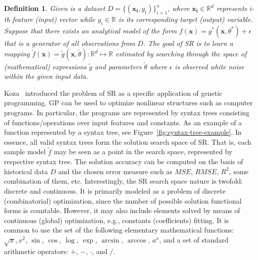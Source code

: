 \documentclass{bmcart}
\newtheorem{definition}{Definition}
\begin{document}
\begin{definition}
	Given is a dataset $D = \{(\mathbf{x_i}, y_i)\}_{i=1}^n$, where $\mathbf{x_i} \in \mathbb{R}^d$ represents i-th feature (input) vector while $y_i \in \mathbb{R}$ is its corresponding target (output) variable. Suppose that there exists an analytical model of the form $f(\mathbf{x})= g^*(\mathbf{x}, \theta^*) + \epsilon $ that is a generator of all observations from $D$.  
	The goal of SR is to learn a mapping $\tilde{f}(\mathbf{x})=  \tilde{g}(\mathbf{x}, \tilde{\theta})  \colon \mathbb{R}^d \mapsto \mathbb{R}$  estimated by searching through the space of (mathematical) expressions  $\tilde{g}$ and parameters $\tilde{\theta}$ where  $\epsilon$ is observed white noise within the given input data. 
	
\end{definition}

Koza~\cite{koza1994genetic} introduced the problem of SR as a specific application of genetic programming. GP can be used to optimize nonlinear structures such as computer programs. In particular, the programs are represented by syntax trees consisting of functions/operations over input features and constants. As an example of a function represented by a syntax tree, see Figure~\ref{fig:syntax-tree-example}. In essence, all valid syntax trees form the solution search space of SR. That is, each sample model $\tilde{f}$ may be seen as a point in the search space, represented by respective syntax tree. The solution accuracy can be computed on the basis of historical data $D$ and the chosen error measure such as $MSE$, $RMSE$, $R^2$, some combination of them, etc. Interestingly, the SR search space nature is twofold: discrete and continuous. It is primarily modeled as a problem of discrete (combinatorial) optimization, since the number of possible solution functional forms is countable. However, it may also include elements solved by means of continuous (global) optimization, e.g., constants (coefficients) fitting. It is common to use the set of the following elementary mathematical functions: $\sqrt{x}, x^2 $, $\sin$, $\cos$, $\log$, $\exp$, $\arcsin$, $\arccos$, $a^x$, and a set of standard arithmetic operators: $+$, $-$, $\cdot$, and $/$. 
\end{document}
